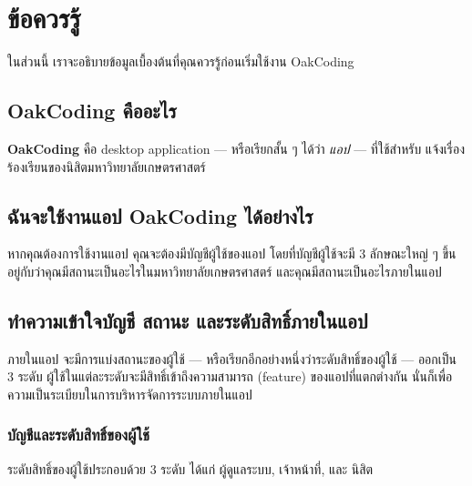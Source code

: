 \section*{ข้อควรรู้}

ในส่วนนี้ เราจะอธิบายข้อมูลเบื้องต้นที่คุณควรรู้ก่อนเริ่มใช้งาน OakCoding

\rule{0em}{1ex}
\subsection*{OakCoding คืออะไร}
\textbf{OakCoding} คือ desktop application --- หรือเรียกสั้น ๆ ได้ว่า \emph{แอป} --- ที่ใช้สำหรับ
แจ้งเรื่องร้องเรียนของนิสิตมหาวิทยาลัยเกษตรศาสตร์

\rule{0em}{1ex}
\subsection*{ฉันจะใช้งานแอป OakCoding ได้อย่างไร}
หากคุณต้องการใช้งานแอป คุณจะต้องมีบัญชีผู้ใช้ของแอป โดยที่บัญชีผู้ใช้จะมี 3 ลักษณะใหญ่ ๆ ขึ้นอยู่กับว่าคุณมีสถานะเป็นอะไรในมหาวิทยาลัยเกษตรศาสตร์
และคุณมีสถานะเป็นอะไรภายในแอป

\rule{0em}{1ex}
\subsection*{ทำความเข้าใจบัญชี สถานะ และระดับสิทธิ์ภายในแอป}
ภายในแอป จะมีการแบ่งสถานะของผู้ใช้ --- หรือเรียกอีกอย่างหนึ่งว่าระดับสิทธิ์ของผู้ใช้ --- ออกเป็น 3 ระดับ
ผู้ใช้ในแต่ละระดับจะมีสิทธิ์เข้าถึงความสามารถ (feature) ของแอปที่แตกต่างกัน นั่นก็เพื่อความเป็นระเบียบในการบริหารจัดการระบบภายในแอป

\newpage

\subsubsection*{บัญชีและระดับสิทธิ์ของผู้ใช้}
ระดับสิทธิ์ของผู้ใช้ประกอบด้วย 3 ระดับ  ได้แก่ ผู้ดูแลระบบ, เจ้าหน้าที่, และ นิสิต


